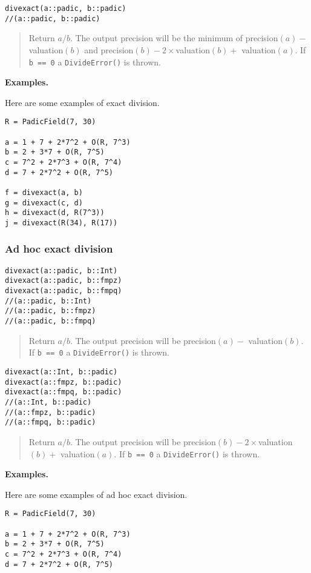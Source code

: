 \documentclass[a4paper,10pt]{article}
\newcommand{\code}{\lstinline}
\newcommand{\desc}[1]{\vspace{-3mm}\begin{quote}#1\end{quote}}
\begin{document}
{{\begin{lstlisting}
divexact(a::padic, b::padic)
//(a::padic, b::padic)
\end{lstlisting}

\desc{Return $a/b$. The output precision will be the minimum of 
precision$(a) -$ valuation$(b)$ and precision$(b) - 2\times$valuation$(b) +$
valuation$(a)$. If \code{b == 0} a \code{DivideError()} is thrown.}

\textbf{Examples.}

Here are some examples of exact division.

\begin{lstlisting}
R = PadicField(7, 30)

a = 1 + 7 + 2*7^2 + O(R, 7^3)
b = 2 + 3*7 + O(R, 7^5)
c = 7^2 + 2*7^3 + O(R, 7^4)
d = 7 + 2*7^2 + O(R, 7^5)

f = divexact(a, b)
g = divexact(c, d)
h = divexact(d, R(7^3))
j = divexact(R(34), R(17))
\end{lstlisting}


\subsubsection{Ad hoc exact division}

\begin{lstlisting}
divexact(a::padic, b::Int)
divexact(a::padic, b::fmpz)
divexact(a::padic, b::fmpq)
//(a::padic, b::Int)
//(a::padic, b::fmpz)
//(a::padic, b::fmpq)
\end{lstlisting}

\desc{Return $a/b$. The output precision will be precision$(a) -$ 
valuation$(b)$. If \code{b == 0} a \code{DivideError()} is thrown.}

\begin{lstlisting}
divexact(a::Int, b::padic)
divexact(a::fmpz, b::padic)
divexact(a::fmpq, b::padic)
//(a::Int, b::padic)
//(a::fmpz, b::padic)
//(a::fmpq, b::padic)
\end{lstlisting}

\desc{Return $a/b$. The output precision will be 
precision$(b) - 2\times$valuation$(b) +$ valuation$(a)$. If \code{b == 0}
a \code{DivideError()} is thrown.}

\textbf{Examples.}

Here are some examples of ad hoc exact division.

\begin{lstlisting}
R = PadicField(7, 30)

a = 1 + 7 + 2*7^2 + O(R, 7^3)
b = 2 + 3*7 + O(R, 7^5)
c = 7^2 + 2*7^3 + O(R, 7^4)
d = 7 + 2*7^2 + O(R, 7^5)


\end{lstlisting}}}
\end{document}
